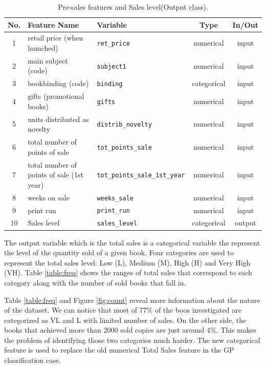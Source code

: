 \documentclass{llncs}
\begin{document}
\begin{table}
\caption{Pre-sales features and Sales level(Output class). } 
\label{tabla:params_pre_sales}
\begin{center}
\begin{tabular}{|c|l|l|c|c|}
\hline 
No. & Feature Name & Variable & Type & In/Out\\
\hline 
1 & retail price (when launched) & \texttt{ret\_price} & numerical & input\\
2 & main subject (code) & \texttt{subject1} & numerical & input\\
3 & bookbinding (code) & \texttt{binding} & categorical & input\\
4 & gifts (promotional books) & \texttt{gifts} & numerical & input\\
5 & units distributed as novelty & \texttt{distrib\_novelty} & numerical & input\\
6 & total number of points of sale & \texttt{tot\_points\_sale} & numerical & input\\
7 & total number of points of sale (1st year) & \texttt{tot\_points\_sale\_1st\_year} & numerical & input\\
8 & weeks on sale & \texttt{weeks\_sale} & numerical & input\\
9 & print run & \texttt{print\_run} & numerical & input\\
\hline 
\hline
10 & Sales level & \texttt{sales\_level} & categorical & output\\
\hline 
\end{tabular}
\end{center}
\end{table}


The output variable which is the total sales is a categorical variable the represent the level of the quantity sold of a given book. Four categories are used to represent the total sales level: Low (L), Medium (M), High (H) and Very High (VH). Table \ref{table:freq} shows the ranges of total sales that correspond to each category along with the number of sold books that fall in. 

Table \ref{table:freq} and Figure \ref{fig:count} reveal more information about the nature of the dataset. We can notice that most of 77\% of the boos investigated are categorized as VL and L with limited number of sales. On the other side, the books that achieved more than 2000 sold copies are just around 4\%. This makes the problem of identifying those two categories much harder. The new categorical feature is used to replace the old numerical Total Sales feature in the GP classification case.
\end{document}
